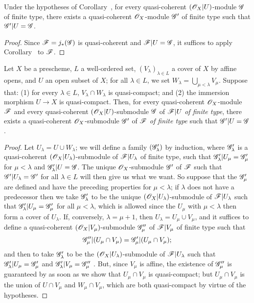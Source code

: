 \begin{corollary}[9.4.5]
\label{1.9.4.5}
Under the hypotheses of Corollary~, for every quasi-coherent $(\mathscr{O}_X|U)$-module
$\mathscr{G}$ of finite type, there exists a quasi-coherent $\mathscr{O}_X$-module $\mathscr{G}'$ of finite
type such that $\mathscr{G}'|U=\mathscr{G}$.
\end{corollary}

\begin{proof}
\label{proof-1.9.4.5}
Since $\mathscr{F}=j_*(\mathscr{G})$ is quasi-coherent  and $\mathscr{F}|U=\mathscr{G}$, it
suffices to apply Corollary~ to $\mathscr{F}$.
\end{proof}

\begin{lemma}[9.4.6]
\label{1.9.4.6}
Let $X$ be a prescheme, $L$ a well-ordered set, $(V_\lambda)_{\lambda\in L}$ a cover of $X$
by affine opens, and $U$ an open subset of $X$; for all $\lambda\in L$, we set
$W_\lambda=\bigcup_{\mu<\lambda}V_\mu$. Suppose that: (1) for every $\lambda\in L$,
$V_\lambda\cap W_\lambda$ is quasi-compact; and (2) the immersion morphism $U\to X$ is
quasi-compact. Then, for every quasi-coherent $\mathscr{O}_X$-module $\mathscr{F}$ and every
quasi-coherent $(\mathscr{O}_X|U)$-submodule $\mathscr{G}$ of $\mathscr{F}|U$ \emph{of finite type}, there
exists a quasi-coherent $\mathscr{O}_X$-submodule $\mathscr{G}'$ of $\mathscr{F}$ \emph{of finite type} such
that $\mathscr{G}'|U=\mathscr{G}$.
\end{lemma}

\begin{proof}
\label{proof-1.9.4.6}
Let $U_\lambda=U\cup W_\lambda$; we will define a family $(\mathscr{G}'_\lambda)$ by induction,
where $\mathscr{G}'_\lambda$ is a quasi-coherent $(\mathscr{O}_X|U_\lambda)$-submodule of
$\mathscr{F}|U_\lambda$ of finite type, such that $\mathscr{G}'_\lambda|U_\mu=\mathscr{G}'_\mu$ for
$\mu<\lambda$ and $\mathscr{G}'_\lambda|U=\mathscr{G}$. The unique $\mathscr{O}_X$-submodule $\mathscr{G}'$ of
$\mathscr{F}$ such that $\mathscr{G}'|U_\lambda=\mathscr{G}'$ for all $\lambda\in L$  will then give
us what we want. So suppose that the $\mathscr{G}'_\mu$ are defined and have the preceding
properties for $\mu<\lambda$; if $\lambda$ does not have a predecessor then we take
$\mathscr{G}'_\lambda$ to be the unique $(\mathscr{O}_X|U_\lambda)$-submodule of $\mathscr{F}|U_\lambda$ such that
$\mathscr{G}'_\lambda|U_\mu=\mathscr{G}'_\mu$ for all $\mu<\lambda$, which is allowed since the $U_\mu$
with $\mu<\lambda$ then form a cover of $U_\lambda$. If, conversely, $\lambda=\mu+1$, then
$U_\lambda=U_\mu\cup V_\mu$, and it suffices to define a quasi-coherent
$(\mathscr{O}_X|V_\mu)$-submodule $\mathscr{G}''_\mu$ of $\mathscr{F}|V_\mu$ of finite type such that
\[
  \mathscr{G}''_\mu|(U_\mu\cap V_\mu)=\mathscr{G}'_\mu|(U_\mu\cap V_\mu);
\]
and then to take $\mathscr{G}'_\lambda$ to be the $(\mathscr{O}_X|U_\lambda)$-submodule of
$\mathscr{F}|U_\lambda$ such that $\mathscr{G}'_\lambda|U_\mu=\mathscr{G}'_\mu$ and
$\mathscr{G}'_\lambda|V_\mu=\mathscr{G}''_\mu$ . But, since $V_\mu$ is affine, the
existence of $\mathscr{G}''_\mu$ is guaranteed by  as soon as we show that
$U_\mu\cap V_\mu$ is quasi-compact; but $U_\mu\cap V_\mu$ is the union of $U\cap V_\mu$ and
$W_\mu\cap V_\mu$, which are both quasi-compact by virtue of the hypotheses.
\end{proof}

